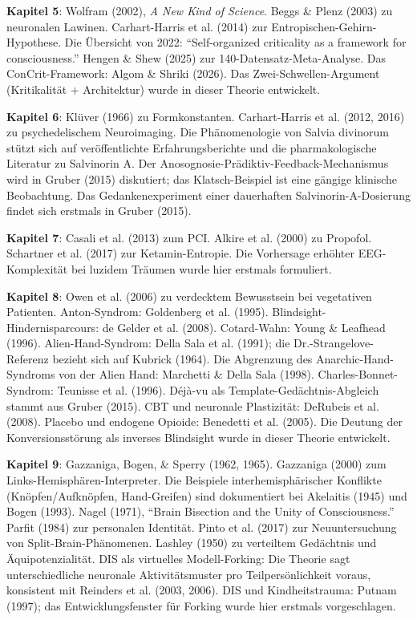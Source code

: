 \documentclass[11pt, twoside, openright]{book}
\begin{document}
\textbf{Kapitel 5}: Wolfram (2002), \textit{A New Kind of Science}. Beggs \& Plenz (2003) zu neuronalen Lawinen. Carhart-Harris et al. (2014) zur Entropischen-Gehirn-Hypothese. Die Übersicht von 2022: ``Self-organized criticality as a framework for consciousness.'' Hengen \& Shew (2025) zur 140-Datensatz-Meta-Analyse. Das ConCrit-Framework: Algom \& Shriki (2026). Das Zwei-Schwellen-Argument (Kritikalität + Architektur) wurde in dieser Theorie entwickelt.

\textbf{Kapitel 6}: Klüver (1966) zu Formkonstanten. Carhart-Harris et al. (2012, 2016) zu psychedelischem Neuroimaging. Die Phänomenologie von Salvia divinorum stützt sich auf veröffentlichte Erfahrungsberichte und die pharmakologische Literatur zu Salvinorin A. Der Anosognosie-Prädiktiv-Feedback-Mechanismus wird in Gruber (2015) diskutiert; das Klatsch-Beispiel ist eine gängige klinische Beobachtung. Das Gedankenexperiment einer dauerhaften Salvinorin-A-Dosierung findet sich erstmals in Gruber (2015).

\textbf{Kapitel 7}: Casali et al. (2013) zum PCI. Alkire et al. (2000) zu Propofol. Schartner et al. (2017) zur Ketamin-Entropie. Die Vorhersage erhöhter EEG-Komplexität bei luzidem Träumen wurde hier erstmals formuliert.

\textbf{Kapitel 8}: Owen et al. (2006) zu verdecktem Bewusstsein bei vegetativen Patienten. Anton-Syndrom: Goldenberg et al. (1995). Blindsight-Hindernisparcours: de Gelder et al. (2008). Cotard-Wahn: Young \& Leafhead (1996). Alien-Hand-Syndrom: Della Sala et al. (1991); die Dr.-Strangelove-Referenz bezieht sich auf Kubrick (1964). Die Abgrenzung des Anarchic-Hand-Syndroms von der Alien Hand: Marchetti \& Della Sala (1998). Charles-Bonnet-Syndrom: Teunisse et al. (1996). Déjà-vu als Template-Gedächtnis-Abgleich stammt aus Gruber (2015). CBT und neuronale Plastizität: DeRubeis et al. (2008). Placebo und endogene Opioide: Benedetti et al. (2005). Die Deutung der Konversionsstörung als inverses Blindsight wurde in dieser Theorie entwickelt.

\textbf{Kapitel 9}: Gazzaniga, Bogen, \& Sperry (1962, 1965). Gazzaniga (2000) zum Links-Hemisphären-Interpreter. Die Beispiele interhemisphärischer Konflikte (Knöpfen/Aufknöpfen, Hand-Greifen) sind dokumentiert bei Akelaitis (1945) und Bogen (1993). Nagel (1971), ``Brain Bisection and the Unity of Consciousness.'' Parfit (1984) zur personalen Identität. Pinto et al. (2017) zur Neuuntersuchung von Split-Brain-Phänomenen. Lashley (1950) zu verteiltem Gedächtnis und Äquipotenzialität. DIS als virtuelles Modell-Forking: Die Theorie sagt unterschiedliche neuronale Aktivitätsmuster pro Teilpersönlichkeit voraus, konsistent mit Reinders et al. (2003, 2006). DIS und Kindheitstrauma: Putnam (1997); das Entwicklungsfenster für Forking wurde hier erstmals vorgeschlagen.
\end{document}
